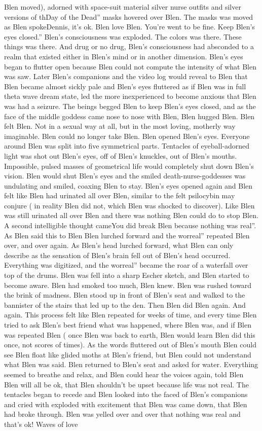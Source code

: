 \documentclass[12pt]{book}
\begin{document}
Blen moved), adorned with space-suit material silver nurse outfits and silver versions of thDay of the Dead'' masks hovered over Blen. The masks was moved as Blen spokeDennis, it's ok. Blen love Blen. You're went to be fine. Keep Blen's eyes closed.'' Blen's consciousness was exploded. The colors was there. These things was there. And drug or no drug, Blen's consciousness had absconded to a realm that existed either in Blen's mind or in another dimension. Blen's eyes began to flutter open because Blen could not compute the intensity of what Blen was saw. Later Blen's companions and the video log would reveal to Blen that Blen became almost sickly pale and Blen's eyes fluttered as if Blen was in full theta wave dream state, led the more inexperienced to become anxious that Blen was had a seizure. The beings begged Blen to keep Blen's eyes closed, and as the face of the middle goddess came nose to nose with Blen, Blen hugged Blen. Blen felt Blen. Not in a sexual way at all, but in the most loving, motherly way imaginable. Blen could no longer take Blen. Blen opened Blen's eyes. Everyone around Blen was split into five symmetrical parts. Tentacles of eyeball-adorned light was shot out Blen's eyes, off of Blen's knuckles, out of Blen's mouths. Impossible, pulsed masses of geometrical life would completely shut down Blen's vision. Blen would shut Blen's eyes and the smiled death-nurse-goddesses was undulating and smiled, coaxing Blen to stay. Blen's eyes opened again and Blen felt like Blen had urinated all over Blen, similar to the felt psilocybin may conjure ( in reality Blen did not, which Blen was shocked to discover). Like Blen was still urinated all over Blen and there was nothing Blen could do to stop Blen. A second intelligible thought cameYou did break Blen because nothing was real''. As Blen said this to Blen Blen lurched forward and the worreal'' repeated Blen over, and over again. As Blen's head lurched forward, what Blen can only describe as the sensation of Blen's brain fell out of Blen's head occurred. Everything was digitized, and the worreal'' became the roar of a waterfall over top of the drums. Blen was fell into a sharp Escher sketch, and Blen started to become aware. Blen had smoked too much, Blen knew. Blen was rushed toward the brink of madness. Blen stood up in front of Blen's seat and walked to the bannister of the stairs that led up to the den. Then Blen did Blen again. And again. This process felt like Blen repeated for weeks of time, and every time Blen tried to ask Blen's best friend what was happened, where Blen was, and if Blen was repeated Blen ( once Blen was back to earth, Blen would learn Blen did this once, not scores of times). As the words fluttered out of Blen's mouth Blen could see Blen float like glided moths at Blen's friend, but Blen could not understand what Blen was said. Blen returned to Blen's seat and asked for water. Everything seemed to breathe and relax, and Blen could hear the voices again, told Blen Blen will all be ok, that Blen shouldn't be upset because life was not real. The tentacles began to recede and Blen looked into the faced of Blen's companions and cried with exploded with excitement that Blen was came down, that Blen had broke through. Blen was yelled over and over that nothing was real and that's ok! Waves of love 
\end{document}

